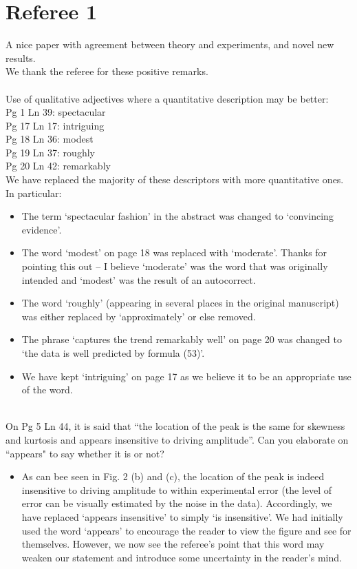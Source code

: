 \documentclass[11pt]{article}
\newcommand{\comment}[1]{{\color{blue} #1}}
\begin{document}
\section*{Referee 1}

\noindent
\comment{A nice paper with agreement between theory and experiments, and novel new results.} \\

\noindent
We thank the referee for these positive remarks. \\ \\

\noindent
\comment{
Use of qualitative adjectives where a quantitative description may be better: \\
Pg 1 Ln 39: spectacular \\
Pg 17 Ln 17: intriguing \\
Pg 18 Ln 36: modest \\
Pg 19 Ln 37: roughly \\
Pg 20 Ln 42: remarkably} \\

\noindent
We have replaced the majority of these descriptors with more quantitative ones. In particular:
\begin{itemize}
\item The term `spectacular fashion' in the abstract was changed to `convincing evidence'.
\item The word `modest' on page 18 was replaced with `moderate'. Thanks for pointing this out -- I believe `moderate' was the word that was originally intended and `modest' was the result of an autocorrect.
\item The word `roughly' (appearing in several places in the original manuscript) was either replaced by `approximately' or else removed.
\item The phrase `captures the trend remarkably well' on page 20 was changed to `the data is well predicted by formula (53)'.
\item We have kept `intriguing' on page 17 as we believe it to be an appropriate use of the word.
\end{itemize}
\hphantom \\

\noindent
\comment{On Pg 5 Ln 44, it is said that ``the location of the peak is the same for skewness and kurtosis and appears insensitive to driving amplitude''. Can you elaborate on ``appears" to say whether it is or not?}

\begin{itemize}
\item As can bee seen in Fig. 2 (b) and (c), the location of the peak is indeed insensitive to driving amplitude to within experimental error (the level of error can be visually estimated by the noise in the data). Accordingly, we have replaced `appears insensitive' to simply `is insensitive'.
We had initially used the word `appears' to encourage the reader to view the figure and see for themselves. However, we now see the referee's point that this word may weaken our statement and introduce some uncertainty in the reader's mind.
\end{itemize}
\end{document}
